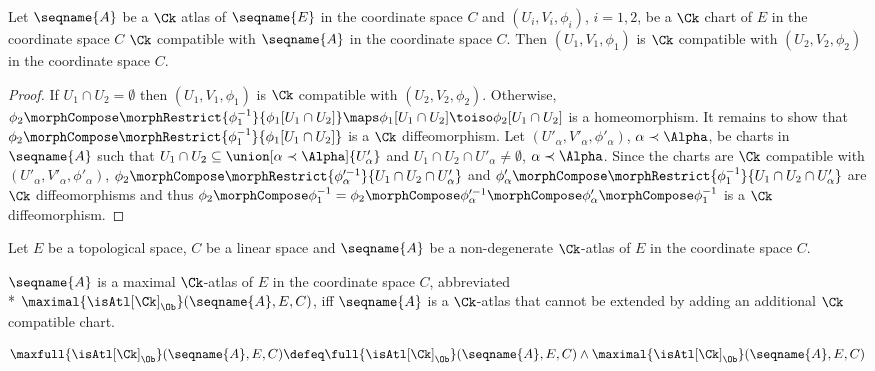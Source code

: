 \documentclass{article}
\begin{document}
\begin{lemma}
\label{Ck-atl:extensions}
Let $\seqname{A}$ be a $\Ck$ atlas of $\seqname{E}$ in the coordinate
space $C$ and $(U_i,V_i,\phi_i)$, $i=1,2$, be a $\Ck$ chart of $E$ in
the coordinate space $C$ $\Ck$ compatible with $\seqname{A}$ in the
coordinate space $C$. Then $(U_1,V_1,\phi_1)$ is $\Ck$ compatible with
$(U_2,V_2,\phi_2)$ in the coordinate space $C$.

\begin{proof}
If $U_1 \cap U_2 = \emptyset$ then $(U_1,V_1,\phi_1)$ is
$\Ck$ compatible with $(U_2,V_2,\phi_2)$. Otherwise,
$\phi_2 \morphCompose \morphRestrict{\phi^{-1}_1}{\phi_1[U_1 \cap U_2]} \maps
\phi_1[U_1 \cap U_2] \toiso \phi_2[U_1 \cap U_2]$
is a homeomorphism.  It remains to show that
$\phi_2 \morphCompose \morphRestrict{\phi^{-1}_1}{\phi_1[U_1 \cap U_2]}$
is a $\Ck$ diffeomorphism.
Let $(U'_\alpha,V'_\alpha,\phi'_\alpha)$, $\alpha \prec \Alpha$, be
charts in $\seqname{A}$ such that
$U_1 \cap U_2 \subseteq \union[\alpha \prec \Alpha]{U'_\alpha}$ and
$U_1 \cap U_2 \cap U'_\alpha \neq \emptyset$, $\alpha \prec \Alpha$.
Since the charts are $\Ck$ compatible with $(U'_\alpha,V'_\alpha,\phi'_\alpha)$,
$\phi_2 \morphCompose \morphRestrict{\phi'^{-1}_\alpha}{U_1 \cap U_2 \cap U'_\alpha}$
and
$\phi'_\alpha \morphCompose \morphRestrict{\phi^{-1}_1}{U_1 \cap U_2 \cap U'_\alpha}$
are $\Ck$ diffeomorphisms and thus
$\phi_2 \morphCompose \phi^{-1}_1 = \phi_2 \morphCompose \phi'^{-1}_\alpha \morphCompose \phi'_\alpha \morphCompose \phi^{-1}_1$
is a $\Ck$ diffeomorphism.
\end{proof}
\end{lemma}

\begin{definition}
\label{def:Ck-ATLmax}
Let $E$ be a topological space, $C$ be a linear space and $\seqname{A}$
be a non-degenerate $\Ck$-atlas of $E$ in the coordinate space $C$.

$\seqname{A}$ is a maximal $\Ck$-atlas of $E$ in the coordinate space
$C$, abbreviated \\*
$\maximal{\isAtl[\Ck]_\Ob}(\seqname{A}, E,C)$, iff $\seqname{A}$ is a
$\Ck$-atlas that cannot be extended by adding an additional $\Ck$
compatible chart.

\begin{equation}
  \maxfull{\isAtl[\Ck]_\Ob}(\seqname{A}, E, C) \defeq
    \full{\isAtl[\Ck]_\Ob}(\seqname{A}, E, C) \land
    \maximal{\isAtl[\Ck]_\Ob}(\seqname{A}, E, C)
\end{equation}
\end{definition}
\end{document}
